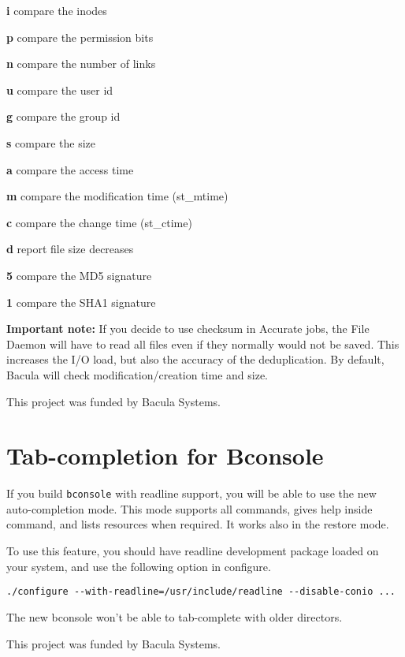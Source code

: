 \begin{description}  
\item {\bf i}  compare the inodes  
\item {\bf p}  compare the permission bits  
\item {\bf n}  compare the number of links  
\item {\bf u}  compare the user id  
\item {\bf g}  compare the group id  
\item {\bf s}  compare the size  
\item {\bf a}  compare the access time  
\item {\bf m}  compare the modification time (st\_mtime)  
\item {\bf c}  compare the change time (st\_ctime)  
\item {\bf d}  report file size decreases  
\item {\bf 5}  compare the MD5 signature  
\item {\bf 1}  compare the SHA1 signature  
\end{description}

\textbf{Important note:} If you decide to use checksum in Accurate jobs,
the File Daemon will have to read all files even if they normally would not
be saved.  This increases the I/O load, but also the accuracy of the
deduplication.  By default, Bacula will check modification/creation time
and size.

This project was funded by Bacula Systems.

\section{Tab-completion for Bconsole}
\label{sec:tabcompletion}

If you build \texttt{bconsole} with readline support, you will be able to use
the new auto-completion mode. This mode supports all commands, gives help
inside command, and lists resources when required. It works also in the restore
mode.

To use this feature, you should have readline development package loaded on
your system, and use the following option in configure.
\begin{verbatim}
./configure --with-readline=/usr/include/readline --disable-conio ...
\end{verbatim}

The new bconsole won't be able to tab-complete with older directors.

This project was funded by Bacula Systems.

